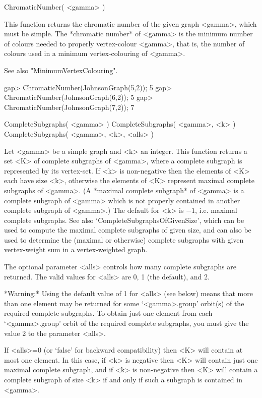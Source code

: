 \>ChromaticNumber( <gamma> )

This function returns the chromatic number of the given graph <gamma>,
which must be simple.  The *chromatic number*
of <gamma> is the minimum number of colours needed to properly vertex-colour
<gamma>, that is, the number of colours used in a minimum vertex-colouring
of <gamma>.

See also "MinimumVertexColouring".

\beginexample
gap> ChromaticNumber(JohnsonGraph(5,2));
5
gap> ChromaticNumber(JohnsonGraph(6,2));
5
gap> ChromaticNumber(JohnsonGraph(7,2));
7
\endexample


\>CompleteSubgraphs( <gamma> )
\>CompleteSubgraphs( <gamma>, <k> )
\>CompleteSubgraphs( <gamma>, <k>, <alls> )

Let <gamma> be a simple graph and <k> an integer. This function returns
a set <K> of complete subgraphs of <gamma>, where a complete subgraph is
represented by its vertex-set.  If <k> is non-negative then the elements
of <K> each have size <k>, otherwise the elements of <K> represent maximal
complete subgraphs of <gamma>. (A *maximal complete subgraph* of <gamma>
is a complete subgraph of <gamma> which is not properly contained in
another complete subgraph of <gamma>.) The default for <k> is $-1$,
i.e. maximal complete subgraphs.  See also `CompleteSubgraphsOfGivenSize',
which can be used to compute the maximal complete subgraphs of given
size, and can also be used to determine the (maximal or otherwise)
complete subgraphs with given vertex-weight sum in a vertex-weighted
graph.

The optional parameter <alls> controls how many complete subgraphs are
returned. The valid values for <alls> are 0, 1 (the default), and 2.

*Warning:* Using the default value of 1 for <alls> (see below) means that
more than one element may be returned for some `<gamma>.group' orbit(s)
of the required complete subgraphs.  To obtain just one element from each
`<gamma>.group' orbit of the required complete subgraphs, you must give
the value 2 to the parameter <alls>.

If <alls>=0 (or `false' for backward compatibility) then <K> will contain
at most one element. In this case, if <k> is negative then <K> will
contain just one maximal complete subgraph, and if <k> is non-negative
then <K> will contain a complete subgraph of size <k> if and only if
such a subgraph is contained in <gamma>.

